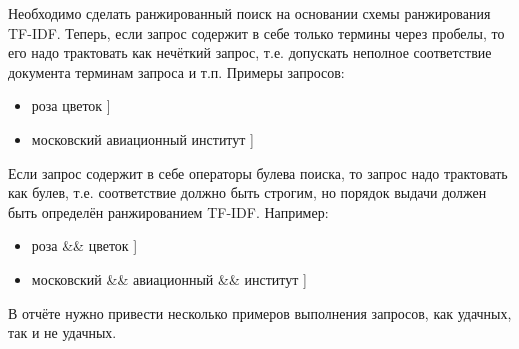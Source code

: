 
Необходимо сделать ранжированный поиск на основании схемы ранжирования TF-IDF. Теперь,
если запрос содержит в себе только термины через пробелы, то его надо трактовать как нечёткий
запрос, т.е. допускать неполное соответствие документа терминам запроса и т.п. Примеры
запросов:
\begin{itemize}
    \item \text{[} роза цветок ]
    \item \text{[} московский авиационный институт ]
\end{itemize}

Если запрос содержит в себе операторы булева поиска, то запрос надо трактовать как булев, т.е.
соответствие должно быть строгим, но порядок выдачи должен быть определён ранжированием
TF-IDF. Например:
\begin{itemize}
    \item \text{[} роза \&\& цветок ]
    \item \text{[} московский \&\& авиационный \&\& институт ]
\end{itemize}

В отчёте нужно привести несколько примеров выполнения запросов, как удачных, так и не
удачных.

\pagebreak
